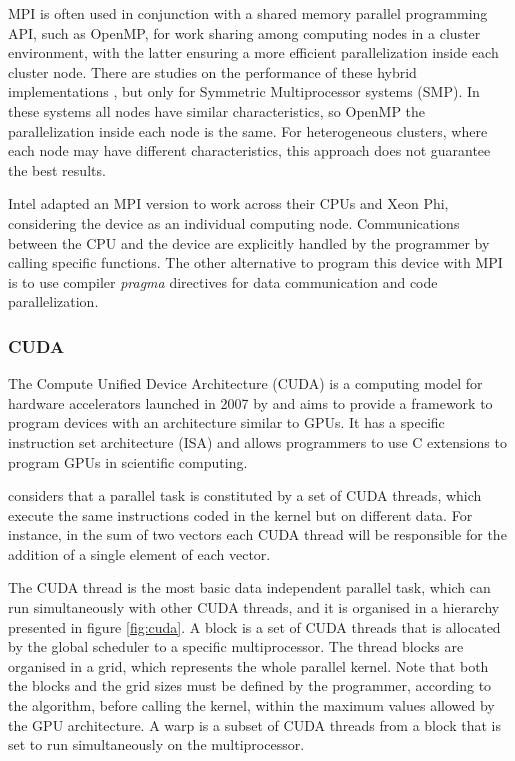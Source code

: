 MPI is often used in conjunction with a shared memory parallel programming API, such as OpenMP, for work sharing among computing nodes in a cluster environment, with the latter ensuring a more efficient parallelization inside each cluster node. There are studies on the performance of these hybrid implementations \cite{MPIOpenMP,MPIOpenMP2}, but only for Symmetric Multiprocessor systems (SMP). In these systems all nodes have similar characteristics, so OpenMP the parallelization inside each node is the same. For heterogeneous clusters, where each node may have different characteristics, this approach does not guarantee the best results.

Intel adapted an MPI version to work across their CPUs and Xeon Phi, considering the device as an individual computing node. Communications between the CPU and the device are explicitly handled by the programmer by calling specific functions. The other alternative to program this device with MPI is to use compiler \textit{pragma} directives for data communication and code parallelization.

\subsubsection*{CUDA}

The Compute Unified Device Architecture (CUDA) is a computing model for hardware accelerators launched in 2007 by \nvidia and aims to provide a framework to program devices with an architecture similar to \nvidia GPUs. It has a specific instruction set architecture (ISA) and allows programmers to use C extensions to program GPUs in scientific computing.

\nvidia considers that a parallel task is constituted by a set of CUDA threads, which execute the same instructions coded in the kernel but on different data. For instance, in the sum of two vectors each CUDA thread will be responsible for the addition of a single element of each vector.

The CUDA thread is the most basic data independent parallel task, which can run simultaneously with other CUDA threads, and it is organised in a hierarchy presented in figure \ref{fig:cuda}. A block is a set of CUDA threads that is allocated by the global scheduler to a specific multiprocessor. The thread blocks are organised in a grid, which represents the whole parallel kernel. Note that both the blocks and the grid sizes must be defined by the programmer, according to the algorithm, before calling the kernel, within the maximum values allowed by the GPU architecture. A warp is a subset of CUDA threads from a block that is set to run simultaneously on the multiprocessor.


